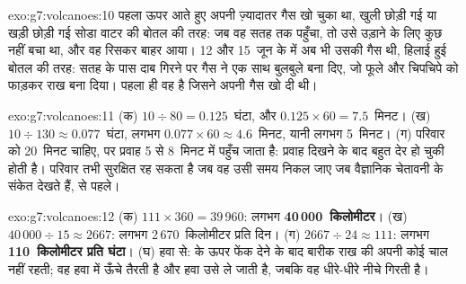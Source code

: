 \begin{solution}{exo:g7:volcanoes:10}
पहला  ऊपर आते हुए अपनी ज़्यादातर गैस खो चुका था, खुली छोड़ी गई या खड़ी
छोड़ी गई सोडा वाटर की बोतल की तरह: जब वह सतह तक पहुँचा, तो उसे उड़ाने के लिए
कुछ नहीं बचा था, और वह रिसकर बाहर आया। 12 और 15~जून के  में अब भी उसकी
गैस थी, हिलाई हुई बोतल की तरह: सतह के पास दाब गिरने पर गैस ने एक साथ बुलबुले
बना दिए, जो फूले और चिपचिपे  को फाड़कर राख बना दिया। पहला  ही वह है
जिसने अपनी गैस खो दी थी।
\end{solution}

\begin{solution}{exo:g7:volcanoes:11}
(क) $10 \div 80 = 0.125$~घंटा, और $0.125 \times 60 = 7.5$~मिनट। (ख)
$10 \div 130 \approx 0.077$~घंटा, लगभग $0.077 \times 60 \approx
4.6$~मिनट, यानी लगभग 5~मिनट। (ग) परिवार को 20~मिनट चाहिए, पर प्रवाह 5 से
8~मिनट में पहुँच जाता है: प्रवाह दिखने के बाद बहुत देर हो चुकी होती है। परिवार
तभी सुरक्षित रह सकता है जब वह उसी समय निकल जाए जब वैज्ञानिक चेतावनी के संकेत
देखते हैं,  से पहले।
\end{solution}

\begin{solution}{exo:g7:volcanoes:12}
(क) $111 \times 360 = 39\,960$: लगभग \textbf{40\,000~किलोमीटर}। (ख)
$40\,000 \div 15 \approx 2667$: लगभग 2\,670~किलोमीटर प्रति दिन। (ग)
$2667 \div 24 \approx 111$: लगभग \textbf{110~किलोमीटर प्रति घंटा}। (घ) हवा
से:  के ऊपर फेंक देने के बाद बारीक राख की अपनी कोई चाल नहीं रहती; वह हवा
में ऊँचे तैरती है और हवा उसे ले जाती है, जबकि वह धीरे-धीरे नीचे
गिरती है।
\end{solution}

